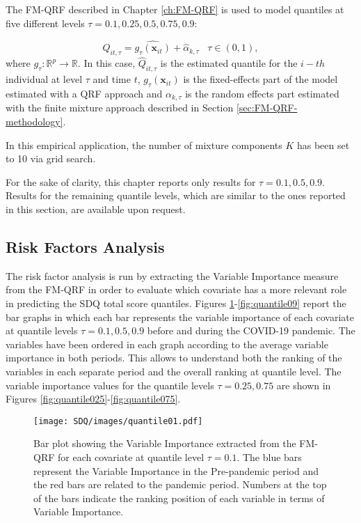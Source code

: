 \vspace{0.15in}

\noindent The FM-QRF described in Chapter \ref{ch:FM-QRF} is used to model quantiles at five different levels $\tau=0.1, 0.25, 0.5, 0.75, 0.9$:

\begin{equation}
\hat{Q}_{it,\tau}=\widehat{g_{\tau}(\mathbf{x}_{it})}+\hat{\alpha}_{k, \tau}  \;\;\;  \tau \in (0,1),
	\end{equation}
where $g_\tau: \mathbb{R}^p \rightarrow \mathbb{R}$. In this case, $\hat{Q}_{it,\tau}$ is the estimated quantile for the $i-th$ individual at level $\tau$ and time $t$, $g_{\tau}(\mathbf{x}_{it})$ is the fixed-effects part of the model estimated with a QRF approach and $\alpha_{k, \tau}$ is the random effects part estimated with the finite mixture approach described in Section \ref{sec:FM-QRF-methodology}.

\noindent In this empirical application, the number of mixture components $K$
has been set to 10 via grid search.

\noindent For the sake of clarity, this chapter reports only results for $\tau=0.1, 0.5, 0.9$. Results for the remaining quantile levels, which are similar to the ones reported in this section, are available upon request.

\subsection{Risk Factors Analysis}

The risk factor analysis is run by extracting the Variable Importance measure from the FM-QRF in order to evaluate which covariate has a more relevant role in predicting the SDQ total score quantiles. Figures \ref{fig:quantile01}-\ref{fig:quantile09} report the bar graphs in which each bar represents the variable importance of each covariate at quantile levels $\tau=0.1, 0.5, 0.9$ before and during the COVID-19 pandemic. The variables have been ordered in each graph according to the average variable importance in both periods. This allows to understand both the ranking of the variables in each separate period and the overall ranking at quantile level. The variable importance values for the quantile levels $ \tau=0.25, 0.75$ are shown in Figures \ref{fig:quantile025}-\ref{fig:quantile075}.

\begin{figure}[H]
    \centering
\texttt{[image: SDQ/images/quantile01.pdf]}
    \caption{Bar plot showing the Variable Importance extracted from the FM-QRF for each covariate at quantile level $\tau=0.1$. The blue bars represent the Variable Importance in the Pre-pandemic period and the red bars are related to the pandemic period. Numbers at the top of the bars indicate the ranking position of each variable in terms of Variable Importance.}
    \label{fig:quantile01}
\end{figure}

